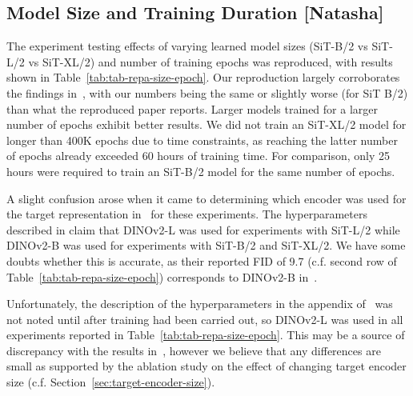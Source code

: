 \documentclass{article}
\begin{document}
\subsection{Model Size and Training Duration [Natasha]}

The experiment testing effects of varying learned model sizes (SiT-B/2 vs SiT-L/2 vs SiT-XL/2) and number of training epochs was reproduced, with results shown in Table~\ref{tab:tab-repa-size-epoch}. Our reproduction largely corroborates the findings in~\cite[Table~3]{yu2025repa}, with our numbers being the same or slightly worse (for SiT B/2) than what the reproduced paper reports. Larger models trained for a larger number of epochs exhibit better results. We did not train an SiT-XL/2 model for longer than 400K epochs due to time constraints, as reaching the latter number of epochs already exceeded 60 hours of training time. For comparison, only 25 hours were required to train an SiT-B/2 model for the same number of epochs.

A slight confusion arose when it came to determining which encoder was used for the target representation in~\cite{yu2025repa} for these experiments. The hyperparameters described in \cite[Table~7]{yu2025repa} claim that DINOv2-L was used for experiments with SiT-L/2 while DINOv2-B was used for experiments with SiT-B/2 and SiT-XL/2. We have some doubts whether this is accurate, as their reported FID of 9.7 (c.f. second row of Table~\ref{tab:tab-repa-size-epoch}) corresponds to DINOv2-B in~\cite[Table~2]{yu2025repa}.

Unfortunately, the description of the hyperparameters in the appendix of~\cite{yu2025repa} was not noted until after training had been carried out, so DINOv2-L was used in all experiments reported in Table~\ref{tab:tab-repa-size-epoch}. This may be a source of discrepancy with the results in~\cite{yu2025repa}, however we believe that any differences are small as supported by the ablation study on the effect of changing target encoder size (c.f. Section~\ref{sec:target-encoder-size}).
\end{document}
